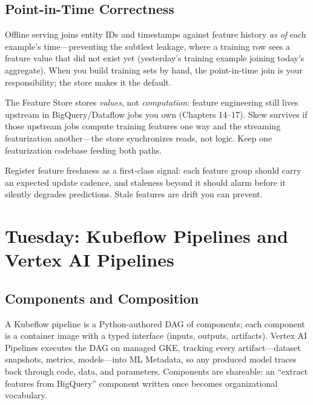 \subsection{Point-in-Time Correctness}
Offline serving joins entity IDs and timestamps against feature history \emph{as of} each example's time---preventing the subtlest leakage, where a training row sees a feature value that did not exist yet (yesterday's training example joining today's aggregate). When you build training sets by hand, the point-in-time join is your responsibility; the store makes it the default.

\begin{pitfall}
The Feature Store stores \emph{values}, not \emph{computation}: feature engineering still lives upstream in BigQuery/Dataflow jobs you own (Chapters 14--17). Skew survives if those upstream jobs compute training features one way and the streaming featurization another---the store synchronizes reads, not logic. Keep one featurization codebase feeding both paths.
\end{pitfall}

\begin{tipbox}
Register feature freshness as a first-class signal: each feature group should carry an expected update cadence, and staleness beyond it should alarm before it silently degrades predictions. Stale features are drift you can prevent.
\end{tipbox}

\section{Tuesday: Kubeflow Pipelines and Vertex AI Pipelines}

\subsection{Components and Composition}
A Kubeflow pipeline is a Python-authored DAG of components; each component is a container image with a typed interface (inputs, outputs, artifacts). Vertex AI Pipelines executes the DAG on managed GKE, tracking every artifact---dataset snapshots, metrics, models---into ML Metadata, so any produced model traces back through code, data, and parameters. Components are shareable: an ``extract features from BigQuery'' component written once becomes organizational vocabulary.

